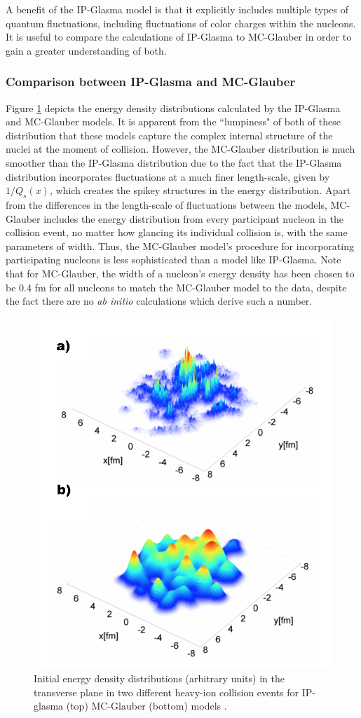 A benefit of the IP-Glasma model is that it explicitly includes multiple types of quantum fluctuations, including fluctuations of color charges within the nucleons. It is useful to compare the calculations of IP-Glasma to MC-Glauber in order to gain a greater understanding of both.
\subsubsection{Comparison between IP-Glasma and MC-Glauber}
Figure \ref{fig:ipg_mcg_comp} depicts the energy density distributions calculated by the IP-Glasma and MC-Glauber models. It is apparent from the ``lumpiness" of both of these distribution that these models capture the complex internal structure of the nuclei at the moment of collision. However, the MC-Glauber distribution is much smoother than the IP-Glasma distribution due to the fact that the IP-Glasma distribution incorporates fluctuations at a much finer length-scale, given by $1/Q_s(x)$, which creates the spikey structures in the energy distribution. Apart from the differences in the length-scale of fluctuations between the models, MC-Glauber includes the energy distribution from every participant nucleon in the collision event, no matter how glancing its individual collision is, with the same parameters of width. Thus, the MC-Glauber model's procedure for incorporating participating nucleons is less sophisticated than a model like IP-Glasma. Note that for MC-Glauber, the width of a nucleon's energy density has been chosen to be 0.4 fm for all nucleons to match the MC-Glauber model to the data, despite the fact there are no \textit{ab initio} calculations which derive such a number.

\begin{figure}[h!]
\begin{center}
\includegraphics[width=0.45\linewidth]{figs/initial_conditions.png}
\caption{ Initial energy density distributions (arbitrary units) in the transverse plane in two different heavy-ion collision events for IP-glasma (top)  MC-Glauber (bottom) models \cite{PhysRevLett.108.252301}.}
\label{fig:ipg_mcg_comp}
\end{center}
\end{figure}

